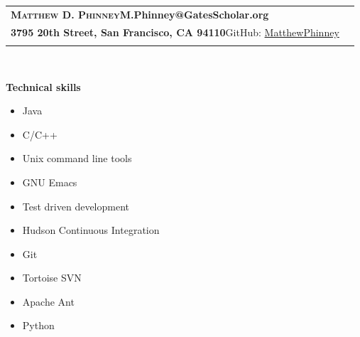 \documentclass[letterpaper,11pt]{article}
\newcommand{\resitem}[1]{\item #1 \vspace{-1pt}}
\newcommand{\resheading}[1]{{\large \colorbox{mygrey}{\begin{minipage}{\textwidth}{\textbf{#1 \vphantom{p\^{E}}}}\end{minipage}}}}
\begin{document}
\renewcommand{\baselinestretch}{1}
 \normalsize

\newcommand{\mywebheader}{
\begin{tabular*}{7in}{l@{\extracolsep{\fill}}r}
	\textbf{{\Huge \textsc{{Matthew D. Phinney}}}}\hfill{\textbf{{M.Phinney@GatesScholar.org}}}\\
	{\textbf{{3795 20th Street, San Francisco, CA 94110}}}\hfill{GitHub: \href{https://github.com/MatthewPhinney}{MatthewPhinney}} \vspace{0.05in}\\
	\fbox{\parbox{\textwidth}{I am a Java developer looking to apply my skills to technical, data--driven projects.  My comprehensive knowledge of algorithms and conscientious approach to problem solving allows me to write clean code with superior performance characteristics.  I excel in an environment that fosters creativity and demands polished results, and I look forward to discussing how I might contribute to your team.}}\vspace{0.05in}\\
	\end{tabular*}
\\
\vspace{0.15in}}

\mywebheader


\resheading{\Large{Technical skills}}
\begin{multicols}{2}
	\begin{itemize}
	\large
		\resitem{Java}
		\resitem{C/C++}
		\resitem{Unix command line tools}
		\resitem{GNU Emacs}
		\resitem{Test driven development}
		\resitem{Hudson Continuous Integration}
		\resitem{Git}
		\resitem{Tortoise SVN}
		\resitem{Apache Ant}
		\resitem{Python}
	\end{itemize}
\end{multicols}
\end{document}
